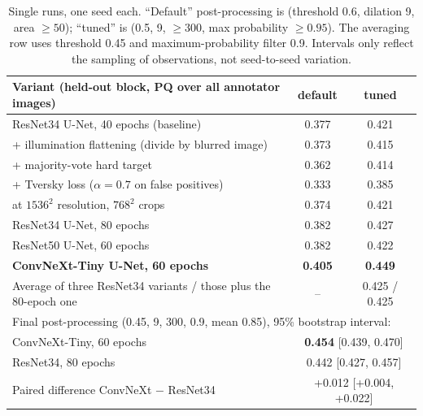 \begin{table}[t]
\centering\small
\begin{tabular}{lcc}
\hline
Variant (held-out block, PQ over all annotator images) & default & tuned\\
\hline
ResNet34 U-Net, 40 epochs (baseline) & 0.377 & 0.421\\
\quad + illumination flattening (divide by blurred image) & 0.373 & 0.415\\
\quad + majority-vote hard target & 0.362 & 0.414\\
\quad + Tversky loss ($\alpha{=}0.7$ on false positives) & 0.333 & 0.385\\
\quad at $1536^2$ resolution, $768^2$ crops & 0.374 & 0.421\\
ResNet34 U-Net, 80 epochs & 0.382 & 0.427\\
ResNet50 U-Net, 60 epochs & 0.382 & 0.422\\
\textbf{ConvNeXt-Tiny U-Net, 60 epochs} & \textbf{0.405} & \textbf{0.449}\\
Average of three ResNet34 variants / those plus the 80-epoch one & -- & 0.425 / 0.425\\
\hline
\multicolumn{3}{l}{Final post-processing (0.45, 9, 300, 0.9, mean 0.85), 95\% bootstrap interval:}\\
ConvNeXt-Tiny, 60 epochs & \multicolumn{2}{c}{\textbf{0.454} [0.439, 0.470]}\\
ResNet34, 80 epochs & \multicolumn{2}{c}{0.442 [0.427, 0.457]}\\
Paired difference ConvNeXt $-$ ResNet34 & \multicolumn{2}{c}{+0.012 [+0.004, +0.022]}\\
\hline
\end{tabular}
\caption{Single runs, one seed each. ``Default'' post-processing is (threshold 0.6, dilation 9, area $\ge50$); ``tuned'' is (0.5, 9, $\ge300$, max probability $\ge0.95$). The averaging row uses threshold 0.45 and maximum-probability filter 0.9. Intervals only reflect the sampling of observations, not seed-to-seed variation.}
\label{tab:exp}
\end{table}

